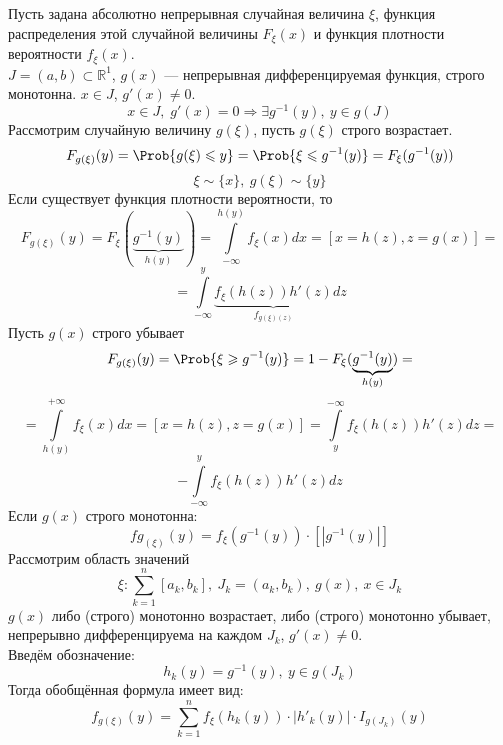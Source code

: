 Пусть задана абсолютно непрерывная случайная величина $\xi$, функция распределения этой случайной величины $F_{\xi} (x) $ и функция плотности вероятности $ f_{\xi} (x) $. \\
$ J = (a, b) \subset \mathbb{R}^1$, $g(x)$ --- непрерывная дифференцируемая функция, строго монотонна. $x \in J$, $g'(x) \neq 0$. 
\[
	x \in J,\; g'(x) = 0 \Rightarrow \exists g^{-1} (y), \ y \in g(J)
\] 
Рассмотрим случайную величину $g(\xi)$, пусть $g(\xi)$ строго возрастает.
\[
	F_{g(\xi)}(y) = \Prob \{ g(\xi) \leqslant y \} = \Prob \{ \xi \leqslant g^{-1}(y) \} = F_{\xi} (g^{-1}(y))
\]
\[
	\xi \sim \{ x \}, \ g(\xi) \sim \{ y \}
\]
Если существует функция плотности вероятности, то
\[
	F_{g(\xi)} (y) = F_{\xi} (\underbrace{g^{-1}(y)}_{h(y)}) = \int\limits_{-\infty}^{h(y)} f_{\xi} (x) dx = [x = h(z), z = g(x)] = 
\]
\[
	= \int\limits_{-\infty}^{y} \underbrace{f_{\xi} (h(z)) h'(z)}_{f_{g(\xi) (z)}} dz
\]
Пусть $g(x)$ строго убывает
\[
	F_{g(\xi)} (y) = \Prob \{ \xi \geqslant g^{-1}(y) \} = 1 - F_{\xi} (\underbrace{g^{-1}(y)}_{h(y)}) = 
\]
\[
	= \int\limits_{h(y)}^{+\infty} f_{\xi} (x) dx = [ x = h(z), z = g(x) ] = \int\limits_{y}^{-\infty} f_{\xi} (h(z)) h'(z) dz =
\]
\[
	- \int\limits_{-\infty}^y f_{\xi} (h(z)) h'(z) dz
\]
Если $g(x)$ строго монотонна:
\[
	fg_{(\xi)} (y) = f_{\xi} (g^{-1}(y)) \cdot [|g^{-1}(y)|]
\]
Рассмотрим область значений
\[
	\xi : \sum\limits_{k = 1}^{n} [a_k, b_k], \ J_k = (a_k, b_k), \ g(x), \ x \in J_k
\]
$g(x)$ либо (строго) монотонно возрастает, либо (строго) монотонно убывает, непрерывно дифференцируема на каждом $J_k$, $g'(x) \neq 0$. \\
Введём обозначение:
\[
	h_k(y) = g^{-1}(y), \ y \in g(J_k)
\]
Тогда обобщённая формула имеет вид:
\[
	f_{g(\xi)} (y) = \sum\limits_{k = 1}^{n} f_{\xi} (h_k(y)) \cdot | {h'}_k(y) | \cdot I_{g(J_k)} (y)
\]
